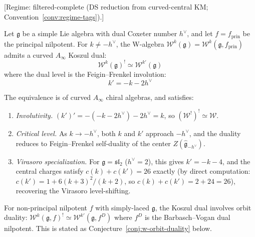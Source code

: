 \begin{theorem}\label{thm:w-algebra-koszul-main}
\textup{[Regime: filtered-complete \textup{(}DS reduction from curved-central KM;
Convention~\textup{\ref{conv:regime-tags})}.]}

Let $\mathfrak{g}$ be a simple Lie algebra with dual Coxeter number $h^\vee$, and let $f = f_{\mathrm{prin}}$ be the principal nilpotent.
For $k \neq -h^\vee$, the W-algebra $\mathcal{W}^k(\mathfrak{g}) = \mathcal{W}^k(\mathfrak{g}, f_{\mathrm{prin}})$ admits a curved $A_\infty$ Koszul dual:
\begin{equation}\label{eq:w-koszul-main}
\mathcal{W}^k(\mathfrak{g})^! \simeq \mathcal{W}^{k'}(\mathfrak{g})
\end{equation}
where the dual level is the Feigin--Frenkel involution:
\begin{equation}\label{eq:ff-level-shift}
k' = -k - 2h^\vee
\end{equation}

The equivalence is of curved $A_\infty$ chiral algebras, and satisfies:
\begin{enumerate}
\item \emph{Involutivity.} $(k')' = -(-k-2h^\vee) - 2h^\vee = k$, so $(\mathcal{W}^!)^! \simeq \mathcal{W}$.
\item \emph{Critical level.} As $k \to -h^\vee$, both $k$ and $k'$ approach $-h^\vee$, and the duality reduces to Feigin--Frenkel self-duality of the center $Z(\widehat{\mathfrak{g}}_{-h^\vee})$.
\item \emph{Virasoro specialization.} For $\mathfrak{g} = \mathfrak{sl}_2$ ($h^\vee = 2$), this gives $k' = -k-4$, and the central charges satisfy $c(k) + c(k') = 26$ exactly (by direct computation: $c(k') = 1 + 6(k+3)^2/(k+2)$, so $c(k)+c(k') = 2 + 24 = 26$), recovering the Virasoro level-shifting.
\end{enumerate}

For non-principal nilpotent $f$ with simply-laced $\mathfrak{g}$, the Koszul dual involves
orbit duality: $\mathcal{W}^k(\mathfrak{g},f)^! \simeq \mathcal{W}^{k'}(\mathfrak{g}, f^D)$ where $f^D$ is the Barbasch--Vogan dual nilpotent. This is stated as Conjecture~\ref{conj:w-orbit-duality} below.
\end{theorem}

